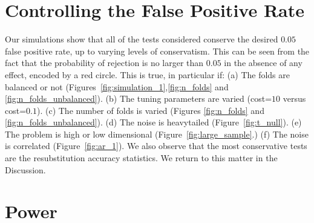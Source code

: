 \documentclass[12pt,a4paper]{article}
\theoremstyle{definition}
\begin{document}
\section{Controlling the False Positive Rate}
\label{sec:type_i}

Our simulations show that all of the tests considered conserve the desired $0.05$ false positive rate, up to varying levels of conservatism.
This can be seen from the fact that the probability of rejection is no larger than $0.05$ in the absence of any effect, encoded by a red circle. 
This is true, in particular if: \newline
(a) The folds are balanced or not (Figures~\ref{fig:simulation_1},\ref{fig:n_folds} and \ref{fig:n_folds_unbalanced}). \newline
(b) The tuning parameters are varied (cost=$10$ versus cost=$0.1$). \newline
(c) The number of folds is varied (Figures \ref{fig:n_folds} and \ref{fig:n_folds_unbalanced}). \newline
(d) The noise is heavytailed (Figure~\ref{fig:t_null}). \newline
(e) The problem is high or low dimensional (Figure~\ref{fig:large_sample}.) \newline
(f) The noise is correlated (Figure~\ref{fig:ar_1}). \newline
We also observe that the most conservative tests are the resubstitution accuracy statistics. 
We return to this matter in the Discussion.







\section{Power}
\label{sec:power}
\end{document}
